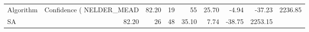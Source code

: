 \begin{tabular}{lrrrrrrr}
\toprule
Algorithm & Confidence (%
\midrule
NELDER_MEAD & 82.20 & 19 & 55 & 25.70 & -4.94 & -37.23 & 2236.85 \\
SA & 82.20 & 26 & 48 & 35.10 & 7.74 & -38.75 & 2253.15 \\
\bottomrule
\end{tabular}
